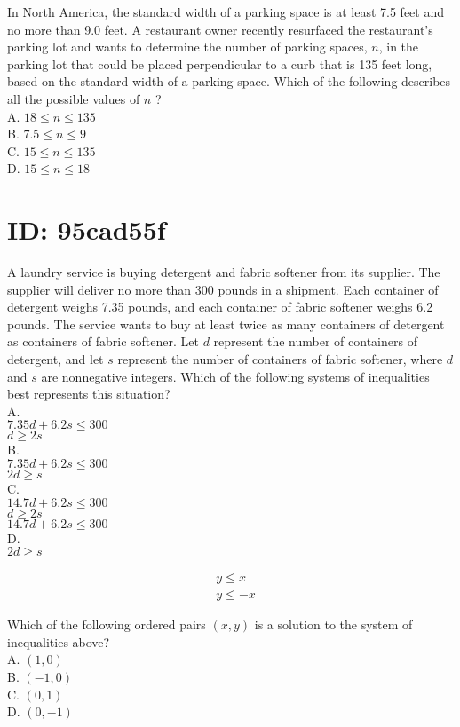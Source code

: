 In North America, the standard width of a parking space is at least 7.5 feet and no more than 9.0 feet. A restaurant owner recently resurfaced the restaurant's parking lot and wants to determine the number of parking spaces, $n$, in the parking lot that could be placed perpendicular to a curb that is 135 feet long, based on the standard width of a parking space. Which of the following describes all the possible values of $n$ ?\\
A. $18 \leq n \leq 135$\\
B. $7.5 \leq n \leq 9$\\
C. $15 \leq n \leq 135$\\
D. $15 \leq n \leq 18$

\section*{ID: 95cad55f}
A laundry service is buying detergent and fabric softener from its supplier. The supplier will deliver no more than 300 pounds in a shipment. Each container of detergent weighs 7.35 pounds, and each container of fabric softener weighs 6.2 pounds. The service wants to buy at least twice as many containers of detergent as containers of fabric softener. Let $d$ represent the number of containers of detergent, and let $s$ represent the number of containers of fabric softener, where $d$ and $s$ are nonnegative integers. Which of the following systems of inequalities best represents this situation?\\
A.\\
$7.35 d+6.2 s \leq 300$\\
$d \geq 2 s$\\
B.\\
$7.35 d+6.2 s \leq 300$\\
$2 d \geq s$\\
C.\\
$14.7 d+6.2 s \leq 300$\\
$d \geq 2 s$\\
$14.7 d+6.2 s \leq 300$\\
D.\\
$2 d \geq s$

$$
\begin{aligned}
& y \leq x \\
& y \leq-x
\end{aligned}
$$

Which of the following ordered pairs $(x, y)$ is a solution to the system of inequalities above?\\
A. $(1,0)$\\
B. $(-1,0)$\\
C. $(0,1)$\\
D. $(0,-1)$

